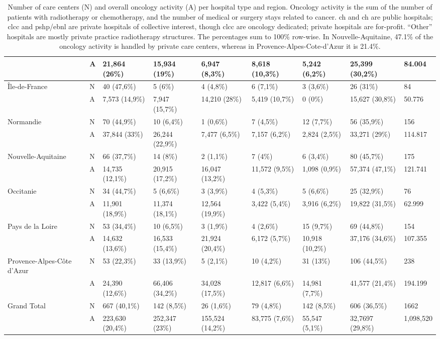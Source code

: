 \begin{table}[!ht]
{\begin{tabular}{|l|l|l|l|l|l|l|l|l|}
        ~ & A & 21,864 (26\%) & 15,934 (19\%) & 6,947 (8,3\%) & 8,618 (10,3\%) & 5,242 (6,2\%) & 25,399 (30,2\%) & 84.004 \\ \hline
        Île-de-France & N & 40 (47,6\%) & 5 (6\%) & 4 (4,8\%) & 6 (7,1\%) & 3 (3,6\%) & 26 (31\%) & 84 \\
        ~ & A & 7,573 (14,9\%) & 7,947 (15,7\%) & 14,210 (28\%) & 5,419 (10,7\%) & 0 (0\%) & 15,627 (30,8\%) & 50.776 \\ \hline
        Normandie & N & 70 (44,9\%) & 10 (6,4\%) & 1 (0,6\%) & 7 (4,5\%) & 12 (7,7\%) & 56 (35,9\%) & 156 \\
        ~ & A & 37,844 (33\%) & 26,244 (22,9\%) & 7,477 (6,5\%) & 7,157 (6,2\%) & 2,824 (2,5\%) & 33,271 (29\%) & 114.817 \\ \hline
        Nouvelle-Aquitaine & N & 66 (37,7\%) & 14 (8\%) & 2 (1,1\%) & 7 (4\%) & 6 (3,4\%) & 80 (45,7\%) & 175 \\
        ~ & A & 14,735 (12,1\%) & 20,915 (17,2\%) & 16,047 (13,2\%) & 11,572 (9,5\%) & 1,098 (0,9\%) & 57,374 (47,1\%) & 121.741 \\ \hline
        Occitanie & N & 34 (44,7\%) & 5 (6,6\%) & 3 (3,9\%) & 4 (5,3\%) & 5 (6,6\%) & 25 (32,9\%) & 76 \\
        ~ & A & 11,901 (18,9\%) & 11,374 (18,1\%) & 12,564 (19,9\%) & 3,422 (5,4\%) & 3,916 (6,2\%) & 19,822 (31,5\%) & 62.999 \\ \hline
        Pays de la Loire & N & 53 (34,4\%) & 10 (6,5\%) & 3 (1,9\%) & 4 (2,6\%) & 15 (9,7\%) & 69 (44,8\%) & 154 \\
        ~ & A & 14,632 (13,6\%) & 16,533 (15,4\%) & 21,924 (20,4\%) & 6,172 (5,7\%) & 10,918 (10,2\%) & 37,176 (34,6\%) & 107.355 \\ \hline
        Provence-Alpes-Côte d'Azur & N & 53 (22,3\%) & 33 (13,9\%) & 5 (2,1\%) & 10 (4,2\%) & 31 (13\%) & 106 (44,5\%) & 238 \\
        ~ & A & 24,390 (12,6\%) & 66,406 (34,2\%) & 34,028 (17,5\%) & 12,817 (6,6\%) & 14,981 (7,7\%) & 41,577 (21,4\%) & 194.199 \\ \hline
        Grand Total & N & 667 (40,1\%) & 142 (8,5\%) & 26 (1,6\%) & 79 (4,8\%) & 142 (8,5\%) & 606 (36,5\%) & 1662 \\
        ~ & A & 223,630 (20,4\%) & 252,347 (23\%) & 155,524 (14,2\%) & 83,775 (7,6\%) & 55,547 (5,1\%) & 32,7697 (29,8\%) & 1,098,520 \\ \hline
    \end{tabular}}
    \caption{
        Number of care centers (N) and overall oncology activity (A) per hospital type and region. Oncology activity is the sum of the number of patients with radiotherapy or chemotherapy, and the number of medical or surgery stays related to cancer. \ac{ch} and \ac{ch} are public hospitals; \ac{clcc} and \ac{pshp}/\ac{ebnl} are private hospitals of collective interest, though \acs{clcc} are oncology dedicated; private hospitals are for-profit. “Other” hospitals are mostly private practice radiotherapy structures. The percentages sum to 100\% row-wise. In Nouvelle-Aquitaine, 47.1\% of the oncology activity is handled by private care centers, whereas in Provence-Alpes-Cote-d’Azur it is 21.4\%.
}
\end{table}
